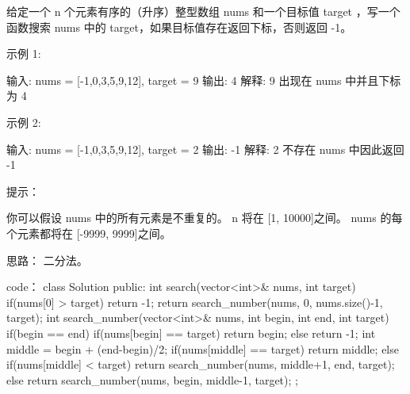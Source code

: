 给定一个 n 个元素有序的（升序）整型数组 nums 和一个目标值 target  ，写一个函数搜索 nums 中的 target，如果目标值存在返回下标，否则返回 -1。


示例 1:

输入: nums = [-1,0,3,5,9,12], target = 9
输出: 4
解释: 9 出现在 nums 中并且下标为 4

示例 2:

输入: nums = [-1,0,3,5,9,12], target = 2
输出: -1
解释: 2 不存在 nums 中因此返回 -1

 

提示：

    你可以假设 nums 中的所有元素是不重复的。
    n 将在 [1, 10000]之间。
    nums 的每个元素都将在 [-9999, 9999]之间。




























思路：
二分法。

























code：
class Solution {
public:
    int search(vector<int>& nums, int target) {
        if(nums[0] > target) return -1;
        return search_number(nums, 0, nums.size()-1, target);
    }
    int search_number(vector<int>& nums, int begin, int end, int target)
    {
        if(begin == end)
        {
            if(nums[begin] == target) return begin;
            else return -1;
        }
        int middle = begin + (end-begin)/2;
        if(nums[middle] == target) return middle;
        else if(nums[middle] < target) return search_number(nums, middle+1, end, target);
        else return search_number(nums, begin, middle-1, target);
    }
};